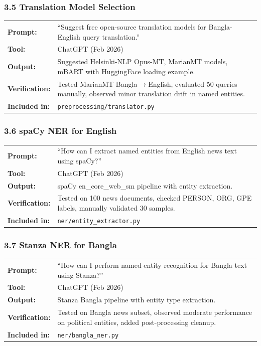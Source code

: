 \documentclass[12pt,a4paper]{article}
\begin{document}
\subsubsection*{3.5 Translation Model Selection}
\begin{tabular}{p{3.2cm}p{9.5cm}}
\textbf{Prompt:}        & ``Suggest free open-source translation models for Bangla-English query translation.'' \\
\textbf{Tool:}          & ChatGPT (Feb 2026) \\
\textbf{Output:}        & Suggested Helsinki-NLP Opus-MT, MarianMT models, mBART with HuggingFace loading example. \\
\textbf{Verification:}  & Tested MarianMT Bangla$\to$English, evaluated 50 queries manually, observed minor translation drift in named entities. \\
\textbf{Included in:}   & \texttt{preprocessing/translator.py} \\
\end{tabular}

\subsubsection*{3.6 spaCy NER for English}
\begin{tabular}{p{3.2cm}p{9.5cm}}
\textbf{Prompt:}        & ``How can I extract named entities from English news text using spaCy?'' \\
\textbf{Tool:}          & ChatGPT (Feb 2026) \\
\textbf{Output:}        & spaCy en\_core\_web\_sm pipeline with entity extraction. \\
\textbf{Verification:}  & Tested on 100 news documents, checked PERSON, ORG, GPE labels, manually validated 30 samples. \\
\textbf{Included in:}   & \texttt{ner/entity\_extractor.py} \\
\end{tabular}

\subsubsection*{3.7 Stanza NER for Bangla}
\begin{tabular}{p{3.2cm}p{9.5cm}}
\textbf{Prompt:}        & ``How can I perform named entity recognition for Bangla text using Stanza?'' \\
\textbf{Tool:}          & ChatGPT (Feb 2026) \\
\textbf{Output:}        & Stanza Bangla pipeline with entity type extraction. \\
\textbf{Verification:}  & Tested on Bangla news subset, observed moderate performance on political entities, added post-processing cleanup. \\
\textbf{Included in:}   & \texttt{ner/bangla\_ner.py} \\
\end{tabular}
\end{document}
